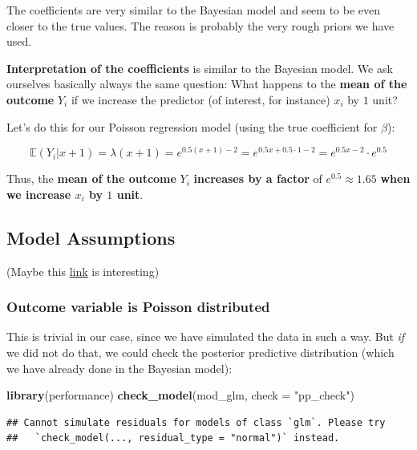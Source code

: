 \documentclass[
]{book}
\newenvironment{Shaded}{\begin{snugshade}}{\end{snugshade}}
\newcommand{\AttributeTok}[1]{\textcolor[rgb]{0.13,0.29,0.53}{#1}}
\newcommand{\FunctionTok}[1]{\textcolor[rgb]{0.13,0.29,0.53}{\textbf{#1}}}
\newcommand{\NormalTok}[1]{#1}
\newcommand{\StringTok}[1]{\textcolor[rgb]{0.31,0.60,0.02}{#1}}
\begin{document}
The coefficients are very similar to the Bayesian model and seem to be even
closer to the true values.
The reason is probably the very rough priors we have used.

\textbf{Interpretation of the coefficients} is similar to the Bayesian model.
We ask ourselves basically always the same question: What happens to the \textbf{mean of the outcome} \(Y_i\)
if we increase the predictor (of interest, for instance) \(x_i\) by \(1\) unit?

Let's do this for our Poisson regression model (using the true coefficient for \(\beta\)):

\[\mathbb{E}(Y_i | x+1) = \lambda(x+1) = e^{0.5(x+1)-2} = e^{0.5x + 0.5 \cdot 1 - 2} = e^{0.5x-2} \cdot e^{0.5}\]

Thus, the \textbf{mean of the outcome} \(Y_i\) \textbf{increases by a factor} of \(e^{0.5} \approx 1.65\)
\textbf{when we increase \(x_i\) by \(1\) unit}.

\subsection{Model Assumptions}\label{model-assumptions}

(Maybe this \href{https://cambiotraining.github.io/stats-glm/materials/checking-assumptions.html}{link}
is interesting)

\subsubsection{Outcome variable is Poisson distributed}\label{outcome-variable-is-poisson-distributed}

This is trivial in our case, since we have simulated the data in such a way.
But \emph{if} we did not do that, we could check the posterior predictive distribution
(which we have already done in the Bayesian model):

\begin{Shaded}
\begin{Highlighting}[]
\FunctionTok{library}\NormalTok{(performance)}
\FunctionTok{check\_model}\NormalTok{(mod\_glm, }\AttributeTok{check =} \StringTok{"pp\_check"}\NormalTok{)}
\end{Highlighting}
\end{Shaded}

\begin{verbatim}
## Cannot simulate residuals for models of class `glm`. Please try
##   `check_model(..., residual_type = "normal")` instead.
\end{verbatim}
\end{document}
